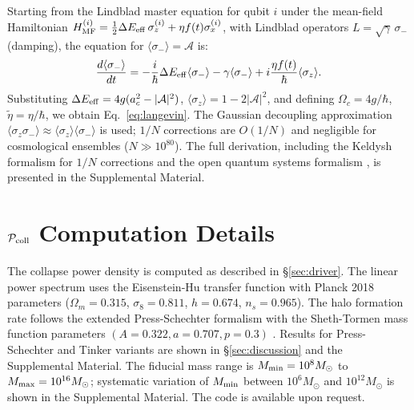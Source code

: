 \documentclass[aps,prd,twocolumn,superscriptaddress]{revtex4-2}
\begin{document}
Starting from the Lindblad master equation for qubit $i$ under the mean-field Hamiltonian $H_{\rm MF}^{(i)} = \frac{1}{2}\Delta E_{\rm eff}\,\sigma_z^{(i)} + \eta f(t)\sigma_x^{(i)}$, with Lindblad operators $L = \sqrt{\gamma}\,\sigma_-$ (damping), the equation for $\langle\sigma_-\rangle = \mathcal{A}$ is:
\begin{equation}
\frac{d\langle\sigma_-\rangle}{dt} = -\frac{i}{\hbar}\Delta E_{\rm eff}\langle\sigma_-\rangle - \gamma\langle\sigma_-\rangle + i\frac{\eta f(t)}{\hbar}\langle\sigma_z\rangle.
\end{equation}
Substituting $\Delta E_{\rm eff} = 4g(a_c^2 - |\mathcal{A}|^2)$, $\langle\sigma_z\rangle = 1-2|\mathcal{A}|^2$, and defining $\Omega_c = 4g/\hbar$, $\tilde{\eta} = \eta/\hbar$, we obtain Eq.~\eqref{eq:langevin}. The Gaussian decoupling approximation $\langle\sigma_z\sigma_-\rangle \approx \langle\sigma_z\rangle\langle\sigma_-\rangle$ is used; $1/N$ corrections are $O(1/N)$ and negligible for cosmological ensembles ($N \gg 10^{80}$). The full derivation, including the Keldysh formalism for $1/N$ corrections and the open quantum systems formalism \cite{Breuer:2002}, is presented in the Supplemental Material.

\section{$\mathcal{P}_{\rm coll}$ Computation Details}
\label{app:pcoll}

The collapse power density is computed as described in \S\ref{sec:driver}. The linear power spectrum uses the Eisenstein-Hu transfer function with Planck 2018 parameters ($\Omega_m=0.315$, $\sigma_8=0.811$, $h=0.674$, $n_s=0.965$). The halo formation rate follows the extended Press-Schechter formalism \cite{Lacey:1993,Sasaki:1994} with the Sheth-Tormen mass function parameters $(A=0.322, a=0.707, p=0.3)$ \cite{Sheth:1999}. Results for Press-Schechter and Tinker \cite{Tinker:2008} variants are shown in \S\ref{sec:discussion} and the Supplemental Material. The fiducial mass range is $M_{\rm min} = 10^8 M_\odot$ to $M_{\rm max} = 10^{16} M_\odot$; systematic variation of $M_{\rm min}$ between $10^6 M_\odot$ and $10^{12} M_\odot$ is shown in the Supplemental Material. The code is available upon request.
\end{document}
